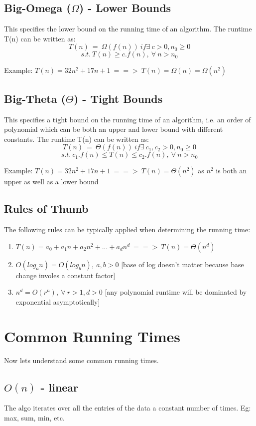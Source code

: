 \subsection{Big-Omega ($\Omega$) - Lower Bounds}
This specifies the lower bound on the running time of an algorithm. The runtime T(n) can be written as:
$$ T(n)\ =\ \Omega(f(n))\ if \exists\ c>0, n_0 \ge 0 $$
$$ s.t.\ T(n) \ge c.f(n),\ \forall\ n>n_0 $$

Example: $T(n)=32n^2+17n+1\ ==>\ T(n)=\Omega(n)=\Omega(n^2)$

\subsection{Big-Theta ($\Theta$) - Tight Bounds}
This specifies a tight bound on the running time of an algorithm, i.e. an order of polynomial which can be both an upper and lower bound with different constants. The runtime T(n) can be written as:
$$ T(n)\ =\ \Theta(f(n))\ if \exists\ c_1,c_2>0, n_0 \ge 0 $$
$$ s.t.\ c_1.f(n) \le T(n) \le c_2.f(n),\ \forall\ n>n_0 $$

Example: $T(n)=32n^2+17n+1\ ==>\ T(n)=\Theta(n^2)$ as $n^2$ is both an upper as well as a lower bound

\subsection{Rules of Thumb}
The following rules can be typically applied when determining the running time:
\begin{enumerate}
    \item $T(n)=a_0+a_1n+a_2n^2+...+a_dn^d\ ==>\ T(n)=\Theta(n^d)$
    \item $O(log_a n) = O(log_b n),\ a,b>0 $ [base of log doesn't matter because base change involes a constant factor]
    \item $ n^d=O(r^n),\ \forall\ r>1,d>0$ [any polynomial runtime will be dominated by exponential asymptotically]
\end{enumerate}

\section{Common Running Times}
Now lets understand some common running times.

\subsection{$O(n)$ - linear}
The algo iterates over all the entries of the data a constant number of times. Eg: max, sum, min, etc.

